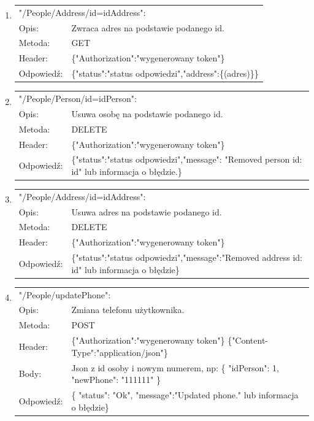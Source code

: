 \documentclass[12pt, titlepage]{article}
\begin{document}
\begin{enumerate}
	\item
	{\renewcommand{\arraystretch}{1.5}
	\begin{tabular}[t]{p{3cm} p{15cm}}
	\multicolumn{2}{l}{"/People/Address/id={idAddress}":} \\
	Opis: &  Zwraca adres na podstawie podanego id. \\
	Metoda: & GET \\
	Header: & \{"Authorization":"wygenerowany token"\} \\
	Odpowiedź: & \{"status":"status odpowiedzi",\newline "address":\{(adres)\}\}
	\end{tabular}}
	
	\item
	{\renewcommand{\arraystretch}{1.5}
	\begin{tabular}[t]{p{3cm} p{15cm}}
	\multicolumn{2}{l}{"/People/Person/id={idPerson}":} \\
	Opis: &  Usuwa osobę na podstawie podanego id. \\
	Metoda: & DELETE \\
	Header: & \{"Authorization":"wygenerowany token"\} \\
	Odpowiedź: & \{"status":"status odpowiedzi",\newline "message": "Removed person id: {id}" lub informacja o błędzie.\}
	\end{tabular}}
	
	\item
	{\renewcommand{\arraystretch}{1.5}
	\begin{tabular}[t]{p{3cm} p{15cm}}
	\multicolumn{2}{l}{"/People/Address/id={idAddress}":} \\
	Opis: &  Usuwa adres na podstawie podanego id. \\
	Metoda: & DELETE \\
	Header: & \{"Authorization":"wygenerowany token"\} \\
	Odpowiedź: & \{"status":"status odpowiedzi",\newline "message":"Removed address id: {id}" lub informacja o błędzie\} 
	\end{tabular}}
	
	\item
	{\renewcommand{\arraystretch}{1.5}
	\begin{tabular}[t]{p{3cm} p{15cm}}
	\multicolumn{2}{l}{"/People/updatePhone":} \\
	Opis: &  Zmiana telefonu użytkownika. \\
	Metoda: & POST \\
	Header: & \{"Authorization":"wygenerowany token"\} \newline \{"Content-Type":"application/json"\} \\
	Body: & Json z id osoby i nowym numerem, np: \newline
	\{
	"idPerson": 1,\newline
	"newPhone": "111111"
\}\\
	Odpowiedź: & \{
    "status": "Ok",\newline
    "message":"Updated phone." lub informacja o błędzie\} 
	\end{tabular}}
	

\end{enumerate}
\end{document}
